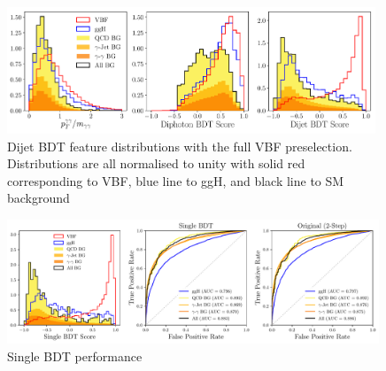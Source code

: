 \begin{figure}[h!]
    \includegraphics[width=0.98\textwidth]{figures/appendix_VBFLPS/combined_BDT_features_splitBG_LPS.pdf}
    \caption{Dijet BDT feature distributions with the full VBF preselection. Distributions are all normalised to unity with solid red corresponding to VBF, blue line to ggH, and black line to SM background}
    \label{fig:vbf_lps_appendix:dijet_bdt_features}
\end{figure}
\begin{figure}[h!]
    \includegraphics[width=0.99\textwidth]{figures/appendix_VBFLPS/dijet_BDT_LPS_unw.pdf}
    \caption{Single BDT performance}
    \label{fig:vbf_lps_appendix:single_BDT}
\end{figure}

